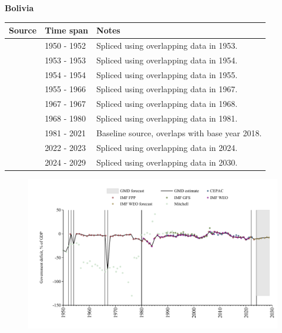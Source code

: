 \documentclass[12pt,a4paper,landscape]{article}
\begin{document}
\begin{adjustbox}{max totalsize={\paperwidth}{\paperheight},center}
\begin{minipage}[t][\textheight][t]{\textwidth}
\vspace*{0.5cm}
{}
\begin{center}
{\Large\bfseries Bolivia}
\end{center}
\vspace{0.5cm}
\begin{table}[H]
\centering
\small
\begin{tabular}{|l|l|l|}
\hline
\textbf{Source} & \textbf{Time span} & \textbf{Notes} \\
\hline
\rowcolor{white}\cite{Mitchell}& 1950 - 1952 &Spliced using overlapping data in 1953.\\
\rowcolor{lightgray}\cite{IMF_FPP}& 1953 - 1953 &Spliced using overlapping data in 1954.\\
\rowcolor{white}\cite{Mitchell}& 1954 - 1954 &Spliced using overlapping data in 1955.\\
\rowcolor{lightgray}\cite{IMF_FPP}& 1955 - 1966 &Spliced using overlapping data in 1967.\\
\rowcolor{white}\cite{Mitchell}& 1967 - 1967 &Spliced using overlapping data in 1968.\\
\rowcolor{lightgray}\cite{IMF_FPP}& 1968 - 1980 &Spliced using overlapping data in 1981.\\
\rowcolor{white}\cite{IMF_WEO}& 1981 - 2021 &Baseline source, overlaps with base year 2018.\\
\rowcolor{lightgray}\cite{IMF_FPP}& 2022 - 2023 &Spliced using overlapping data in 2024.\\
\rowcolor{white}\cite{IMF_WEO_forecast}& 2024 - 2029 &Spliced using overlapping data in 2030.\\
\hline
\end{tabular}
\end{table}
\begin{figure}[H]
\centering
\includegraphics[width=\textwidth,height=0.6\textheight,keepaspectratio]{graphs/BOL_govdef_GDP.pdf}
\end{figure}
\end{minipage}
\end{adjustbox}
\end{document}
